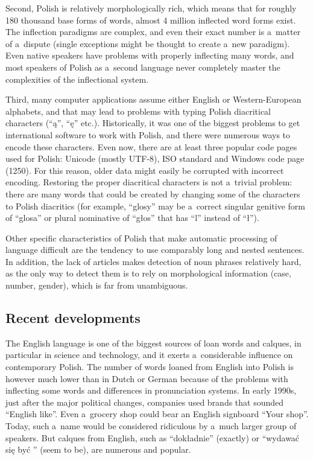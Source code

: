 \begin{multicols}{2}
Second, Polish is relatively morphologically rich, which means that
for roughly 180 thousand base forms of words, almost 4 million
inflected word forms exist. The inflection paradigms are complex, and
even their exact number is a~matter of a~dispute (single exceptions
might be thought to create a~new paradigm). Even native speakers have
problems with properly inflecting many words, and most speakers of
Polish as a~second language never completely master the complexities
of the inflectional system. 


Third, many computer applications assume either English or
Western-European alphabets, and that may lead to problems with typing
Polish diacritical characters (“ą”, “ę” etc.). Historically,
it was one of the biggest problems to get international software to
work with Polish, and there were numerous ways to encode these
characters. Even now, there are at least three popular code pages used
for Polish: Unicode (mostly UTF-8), ISO standard and Windows code page
(1250). For this reason, older data might easily be corrupted with
incorrect encoding. Restoring the proper diacritical characters is not
a~trivial problem: there are many words that could be created by
changing some of the characters to Polish diacritics (for example,
“glosy” may be a~correct singular genitive form of “glosa” or
plural nominative of “głos” that has “l” instead of
“ł”). 

Other specific characteristics of Polish that make automatic
processing of language difficult are the tendency to use comparably
long and nested sentences. In addition, the lack of articles makes
detection of noun phrases relatively hard, as the only way to detect
them is to rely on morphological information (case, number, gender),
which is far from unambiguous. 

\subsection[Recent developments]{Recent developments} 

The English language is one of the biggest sources of loan words and
calques, in particular in science and technology, and it exerts
a~considerable influence on contemporary Polish. The number of words
loaned from English into Polish is however much lower than in Dutch or
German because of the problems with inflecting some words and
differences in pronunciation systems. In early 1990s, just after the
major political changes, companies used brands that sounded “English
like”. Even a~grocery shop could bear an English signboard “Your
shop”. Today, such a~name would be considered ridiculous by a~much
larger group of speakers. But calques from English, such as
“dokładnie” (exactly) or “wydawać się być ” (seem to be),
are numerous and popular. 


\end{multicols}
